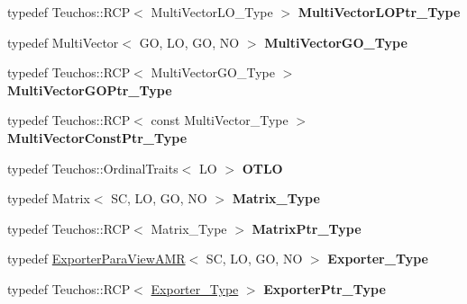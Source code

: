 \begin{DoxyCompactItemize}
typedef Teuchos\+::\+R\+CP$<$ Multi\+Vector\+L\+O\+\_\+\+Type $>$ {\bfseries Multi\+Vector\+L\+O\+Ptr\+\_\+\+Type}
\item 
\mbox{\label{classFEDD_1_1AdaptiveMeshRefinement_aa9c88666e02916392baafb0f6f32a9ed}} 
typedef Multi\+Vector$<$ GO, LO, GO, NO $>$ {\bfseries Multi\+Vector\+G\+O\+\_\+\+Type}
\item 
\mbox{\label{classFEDD_1_1AdaptiveMeshRefinement_a5593f5b047bcd78698da8d9d6c4a7e44}} 
typedef Teuchos\+::\+R\+CP$<$ Multi\+Vector\+G\+O\+\_\+\+Type $>$ {\bfseries Multi\+Vector\+G\+O\+Ptr\+\_\+\+Type}
\item 
\mbox{\label{classFEDD_1_1AdaptiveMeshRefinement_a8caa4d56423da54bdfa117997252a400}} 
typedef Teuchos\+::\+R\+CP$<$ const Multi\+Vector\+\_\+\+Type $>$ {\bfseries Multi\+Vector\+Const\+Ptr\+\_\+\+Type}
\item 
\mbox{\label{classFEDD_1_1AdaptiveMeshRefinement_ad2ca2ac7d7bb5251e9546a8a81077a34}} 
typedef Teuchos\+::\+Ordinal\+Traits$<$ LO $>$ {\bfseries O\+T\+LO}
\item 
\mbox{\label{classFEDD_1_1AdaptiveMeshRefinement_a57f322063d7692248463f5f4fe859a25}} 
typedef Matrix$<$ SC, LO, GO, NO $>$ {\bfseries Matrix\+\_\+\+Type}
\item 
\mbox{\label{classFEDD_1_1AdaptiveMeshRefinement_afc9db004cde1ce278146dceb3533f2a9}} 
typedef Teuchos\+::\+R\+CP$<$ Matrix\+\_\+\+Type $>$ {\bfseries Matrix\+Ptr\+\_\+\+Type}
\item 
\mbox{\label{classFEDD_1_1AdaptiveMeshRefinement_a0a53ee35aa20a5844f6cc3c4d35317f8}} 
typedef \hyperlink{classFEDD_1_1ExporterParaViewAMR}{Exporter\+Para\+View\+A\+MR}$<$ SC, LO, GO, NO $>$ {\bfseries Exporter\+\_\+\+Type}
\item 
\mbox{\label{classFEDD_1_1AdaptiveMeshRefinement_a33d84d4a54886d5e8b58c90500130107}} 
typedef Teuchos\+::\+R\+CP$<$ \hyperlink{classFEDD_1_1ExporterParaViewAMR}{Exporter\+\_\+\+Type} $>$ {\bfseries Exporter\+Ptr\+\_\+\+Type}

\end{DoxyCompactItemize}
